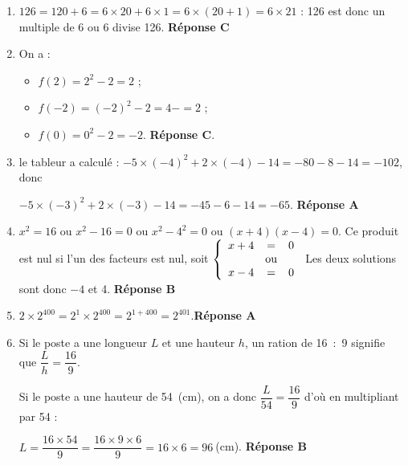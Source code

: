 \begin{enumerate}
\item $126 = 120 + 6 = 6 \times 20 + 6 \times 1 = 6 \times (20 + 1) = 6 \times 21$ : 126 est donc un multiple de $6$ ou 6 divise 126. \textbf{Réponse C}
\item On a :

\begin{itemize}
\renewcommand{\labelitemi}{\decosix~~}
\item $f(2) = 2^2 - 2 = 2$ ;
\item $f(-2) = (- 2)^2 - 2 = 4 - = 2$ ;
\item $f(0) = 0^2 - 2 = - 2$. \textbf{Réponse C}.
\end{itemize}

\item le tableur a calculé : $- 5 \times (- 4)^2 + 2 \times (- 4) - 14 = - 80 - 8 - 14 = - 102$, donc 

$- 5 \times (- 3)^2 + 2 \times (- 3) - 14 = - 45 - 6 - 14 = - 65$. \textbf{Réponse A}
\item $x^2 = 16$ ou $x^2 - 16 = 0$ ou $x^2 - 4^2 = 0$ ou $(x + 4)(x - 4) = 0$. Ce produit est nul si l'un des facteurs est nul, soit $\left\{\begin{array}{lc l}
x + 4&=&0\\
&\text{ou}&\\
x - 4&=&0
\end{array}\right.$ Les deux solutions sont donc $- 4$ et 4. \textbf{Réponse B}
\item $2 \times 2^{400} = 2^1 \times 2^{400} = 2^{1 + 400} = 2^{401}$.\textbf{Réponse A}
\item Si le poste a une longueur $L$ et une hauteur $h$, un ration de 16~:~9 signifie que $\dfrac{L}{h} = \dfrac{16}{9}$.

Si le poste a une hauteur de 54~(cm), on a donc $\dfrac{L}{54} = \dfrac{16}{9}$ d'où en multipliant par 54 :

$L = \dfrac{16 \times 54}{9} = \dfrac{16 \times 9 \times 6}{9} = 16 \times 6 = 96~$(cm). \textbf{Réponse B}
\end{enumerate}

\bigskip

